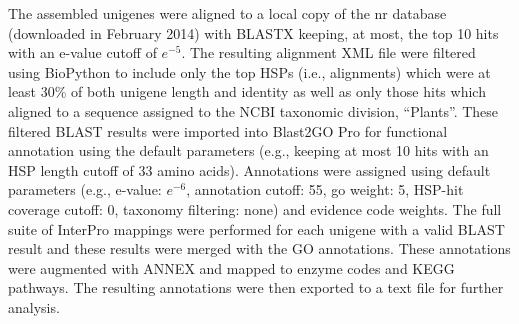 \documentclass[11pt]{article}
\begin{document}
The assembled unigenes were aligned to a local copy of the nr database
(downloaded in February 2014) with BLASTX \citep{citeulike:238188} keeping, at
most, the top 10 hits with an e-value cutoff of $e^{-5}$. The resulting
alignment XML file were filtered using BioPython \citep[v.\
1.6.4]{citeulike:4202607} to include only the top HSPs (i.e., alignments) which
were at least 30\% of both unigene length and identity as well as only those
hits which aligned to a sequence assigned to the NCBI taxonomic division,
``Plants''. These filtered BLAST results were imported into Blast2GO Pro
\citep[v.\ 2.7.2, b2g\_sep14]{citeulike:2733895} for functional annotation using
the default parameters (e.g., keeping at most 10 hits with an HSP length cutoff
of 33 amino acids).  Annotations were assigned using default parameters (e.g.,
e-value: $e^{-6}$, annotation cutoff: 55, go weight: 5, HSP-hit coverage cutoff:
0, taxonomy filtering: none) and evidence code weights. The full suite of
InterPro \citep{citeulike:12942060} mappings were performed for each unigene
with a valid BLAST result and these results were merged with the GO annotations.
These annotations were augmented with ANNEX \citep{annex} and mapped to enzyme
codes and KEGG \citep{citeulike:9172127} pathways. The resulting annotations
were then exported to a text file for further analysis.
\end{document}
